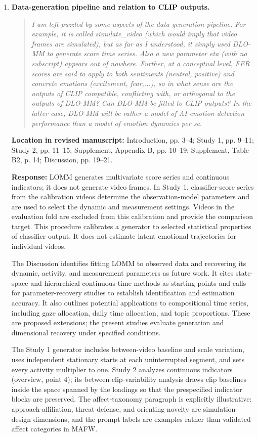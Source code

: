 \documentclass[11pt]{article}
\newenvironment{reviewquote}{\begin{quote}\small\itshape}{\end{quote}}
\newcommand{\point}[1]{\textbf{#1.}}
\newcommand{\location}[1]{\textbf{Location in revised manuscript:} #1\par}
\newcommand{\response}{\textbf{Response:} }
\begin{document}
\begin{enumerate}
  \item \point{Data-generation pipeline and relation to CLIP outputs}
  \begin{reviewquote}
  I am left puzzled by some aspects of the data generation pipeline. For example, it is called simulate\_video (which would imply that video frames are simulated), but as far as I understood, it simply used DLO-MM to generate score time series. Also a new parameter eta (with no subscript) appears out of nowhere. Further, at a conceptual level, FER scores are said to apply to both sentiments (neutral, positive) and concrete emotions (excitement, fear,...), so in what sense are the outputs of CLIP compatible, conflicting with, or orthogonal to the outputs of DLO-MM? Can DLO-MM be fitted to CLIP outputs? In the latter case, DLO-MM will be rather a model of AI emotion detection performance than a model of emotion dynamics per se.
  \end{reviewquote}
  \location{Introduction, pp. 3--4; Study 1, pp. 9--11; Study 2, pp. 11--15; Supplement, Appendix B, pp. 10--19; Supplement, Table B2, p. 14; Discussion, pp. 19--21.}
  \response LOMM generates multivariate score series and continuous indicators; it does not generate video frames. In Study 1, classifier-score series from the calibration videos determine the observation-model parameters and are used to select the dynamic and measurement settings. Videos in the evaluation fold are excluded from this calibration and provide the comparison target. This procedure calibrates a generator to selected statistical properties of classifier output. It does not estimate latent emotional trajectories for individual videos.

  The Discussion identifies fitting LOMM to observed data and recovering its dynamic, activity, and measurement parameters as future work. It cites state-space and hierarchical continuous-time methods as starting points and calls for parameter-recovery studies to establish identification and estimation accuracy. It also outlines potential applications to compositional time series, including gaze allocation, daily time allocation, and topic proportions. These are proposed extensions; the present studies evaluate generation and dimensional recovery under specified conditions.

  The Study 1 generator includes between-video baseline and scale variation, uses independent stationary starts at each uninterrupted segment, and sets every activity multiplier to one. Study 2 analyzes continuous indicators (overview, point 4); its between-clip-variability analysis draws clip baselines inside the space spanned by the loadings so that the prespecified indicator blocks are preserved. The affect-taxonomy paragraph is explicitly illustrative: approach-affiliation, threat-defense, and orienting-novelty are simulation-design dimensions, and the prompt labels are examples rather than validated affect categories in MAFW.


\end{enumerate}
\end{document}
